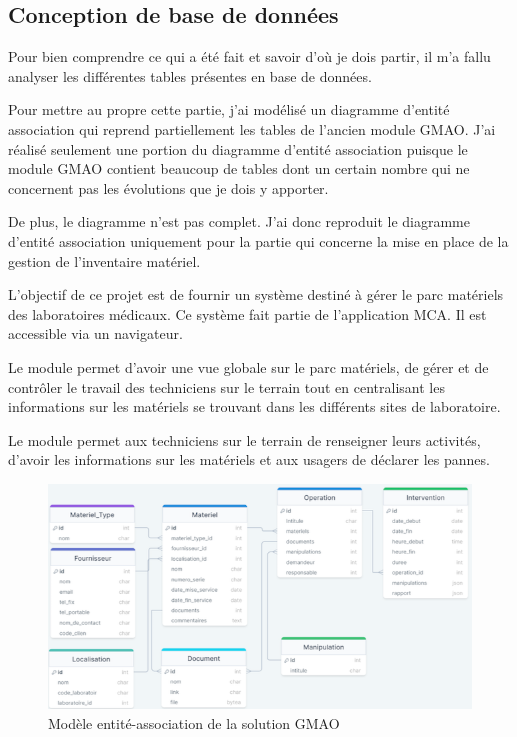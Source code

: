 \subsection{Conception de base de données}
Pour bien comprendre ce qui a été fait et savoir d’où je dois partir, il m’a fallu 
analyser les différentes tables présentes en base de données. 

Pour mettre au propre cette partie, j’ai modélisé un diagramme d’entité association 
qui reprend partiellement les tables de l’ancien module GMAO. J’ai réalisé seulement 
une portion du diagramme d’entité association puisque le module GMAO contient beaucoup 
de tables dont un certain nombre qui ne concernent pas les évolutions que je dois y 
apporter. 

De plus, le diagramme n’est pas complet. J’ai donc reproduit le diagramme d’entité 
association uniquement pour la partie qui concerne la mise en place de la gestion de 
l’inventaire matériel. 

L'objectif de ce projet est de fournir un système destiné à gérer le parc matériels des 
laboratoires médicaux. Ce système fait partie de l’application MCA. Il est accessible 
via un navigateur. 

Le module permet d'avoir une vue globale sur le parc matériels, de gérer et de contrôler 
le travail des techniciens sur le terrain tout en centralisant les informations sur les 
matériels se trouvant dans les différents sites de laboratoire. 

Le module permet aux techniciens sur le terrain de renseigner leurs activités, d'avoir 
les informations sur les matériels et aux usagers de déclarer les pannes.
\begin{figure}[hp]
    \centering
    \includegraphics[width=400pt]{images/db_diagramm.png}
    \caption{Modèle entité-association de la solution GMAO}
\end{figure}
\pagebreak

